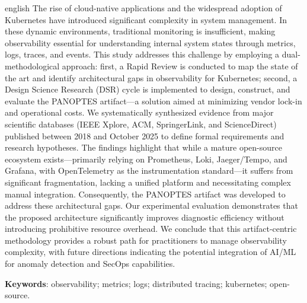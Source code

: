 
\begin{resumo}[Abstract]
\begin{otherlanguage*}{english}
The rise of cloud-native applications and the widespread adoption of Kubernetes have introduced significant complexity in system management. In these dynamic environments, traditional monitoring is insufficient, making observability essential for understanding internal system states through metrics, logs, traces, and events. This study addresses this challenge by employing a dual-methodological approach: first, a Rapid Review is conducted to map the state of the art and identify architectural gaps in observability for Kubernetes; second, a Design Science Research (DSR) cycle is implemented to design, construct, and evaluate the PANOPTES artifact—a solution aimed at minimizing vendor lock-in and operational costs. We systematically synthesized evidence from major scientific databases (IEEE Xplore, ACM, SpringerLink, and ScienceDirect) published between 2018 and October 2025 to define formal requirements and research hypotheses. The findings highlight that while a mature open-source ecosystem exists—primarily relying on Prometheus, Loki, Jaeger/Tempo, and Grafana, with OpenTelemetry as the instrumentation standard—it suffers from significant fragmentation, lacking a unified platform and necessitating complex manual integration. Consequently, the PANOPTES artifact was developed to address these architectural gaps. Our experimental evaluation demonstrates that the proposed architecture significantly improves diagnostic efficiency without introducing prohibitive resource overhead. We conclude that this artifact-centric methodology provides a robust path for practitioners to manage observability complexity, with future directions indicating the potential integration of AI/ML for anomaly detection and SecOps capabilities.

\vspace{\onelineskip}

\noindent
\textbf{Keywords}: observability; metrics; logs; distributed tracing; kubernetes; open-source.
\end{otherlanguage*}
\end{resumo}

